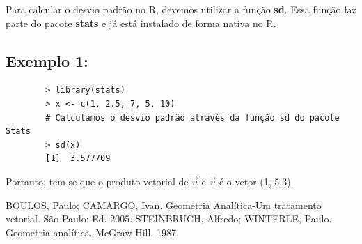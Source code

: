 \documentclass[12pt,a4paper]{article}
\begin{document}
	Para calcular o desvio padrão no R, devemos utilizar a função \textbf{sd}. Essa função faz parte do pacote \textbf{stats} e já está instalado de forma nativa no R.\\

	\subsection*{Exemplo 1:}

	\begin{verbatim}
		> library(stats)
		> x <- c(1, 2.5, 7, 5, 10)
		# Calculamos o desvio padrão através da função sd do pacote Stats
		> sd(x)
		[1]  3.577709
	\end{verbatim}
	Portanto, tem-se que o produto vetorial de $\vec{u}$ e $\vec{v}$ é o vetor (1,-5,3).\\
	
	
	
	\begin{thebibliography}{100}
		
		 BOULOS, Paulo; CAMARGO, Ivan. Geometria Analítica-Um tratamento vetorial. São Paulo: Ed. 2005.
		 STEINBRUCH, Alfredo; WINTERLE, Paulo. Geometria analítica. McGraw-Hill, 1987.
	\end{thebibliography}
	
\end{document}
